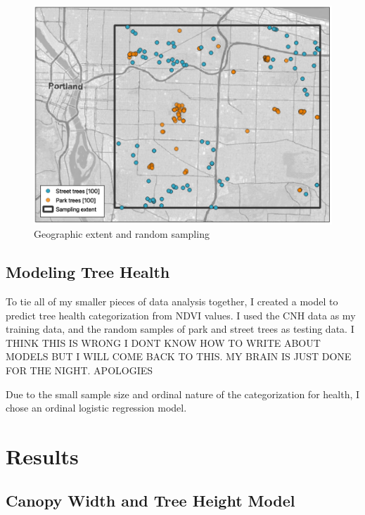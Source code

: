 \documentclass[12pt,twoside]{reedthesis}
\begin{document}
\begin{figure}

{\centering \includegraphics[width=1\linewidth]{figure/extent_and_samples} 

}

\caption{Geographic extent and random sampling}\label{fig:clip-extent}
\end{figure}
\hypertarget{modeling-tree-health}{%
\section{Modeling Tree Health}\label{modeling-tree-health}}

To tie all of my smaller pieces of data analysis together, I created a model to predict tree health categorization from NDVI values. I used the CNH data as my training data, and the random samples of park and street trees as testing data. I THINK THIS IS WRONG I DONT KNOW HOW TO WRITE ABOUT MODELS BUT I WILL COME BACK TO THIS. MY BRAIN IS JUST DONE FOR THE NIGHT. APOLOGIES

Due to the small sample size and ordinal nature of the categorization for health, I chose an ordinal logistic regression model.

\hypertarget{results}{%
\chapter{Results}\label{results}}

\hypertarget{canopy-width-and-tree-height-model-1}{%
\section{Canopy Width and Tree Height Model}\label{canopy-width-and-tree-height-model-1}}
\end{document}
